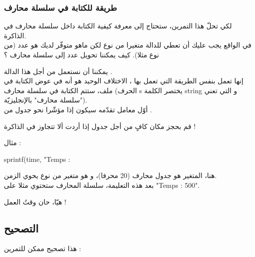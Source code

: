 \subsubsection{طريقة للكتابة في سلسلة محارف}

لكي تحلّ هذا التمرين، ستحتاج إلى معرفة كيفية الكتابة داخل سلسلة محارف في الذاكرة.\\
في الواقع يجب عليك أن تعطي للدالة
متغيرا من نوع
لكن ماهو متوفّر لديك هو عدد (من نوع
مثلا). كيف يمكننا تحويل عدد إلى سلسلة محارف ؟

يمكننا أن نستعمل من أجل هذا الدالة
.\\
إنها تعمل بنفس الطريقة التي تعمل بها
،
الاختلاف الوحيد هو أنه في عوض الكتابة في ملف، ستتم الكتابة في سلسلة محارف (الحرف
\textenglish{s}
يختصر الكلمة
\textenglish{string}
و التي تعني "سلسلة محارف" بالإنجليزيّة).\\
أوّل معامل تقدّمه سيكون إذا مؤشّرا نحو جدول من
.

\begin{critical}
قم بحجز مكان كافٍ من أجل جدول
إذا أردت ألا تتجاوز في الذاكرة !
\end{critical}

مثال :

\begin{Csource}
sprintf(time, "Temps : %
\end{Csource}

هنا، المتغير
هو جدول محارف (20 محرفا)، و
هو متغير من نوع
يحوي الزمن.\\
بعد هذه التعليمة، سلسلة المحارف 
ستحتوي مثلا على
"\textenglish{Temps : 500}".

هيّا، حان وقتُ العمل !

\subsection{التصحيح}

هذا تصحيح ممكن للتمرين :

